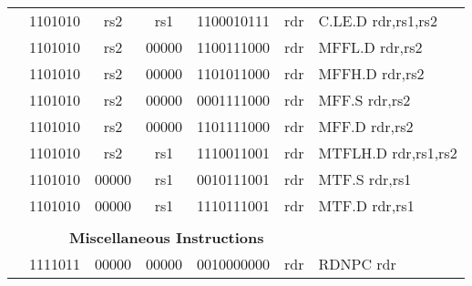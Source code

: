 \begin{table}[p]
\begin{small}
\begin{center}
\begin{tabular}{rcccccccccl}
&
\multicolumn{2}{|c|}{1101010} &
\multicolumn{1}{c|}{rs2} &
\multicolumn{1}{c|}{rs1} &
\multicolumn{4}{c|}{1100010111} &
\multicolumn{1}{c|}{rdr} & C.LE.D rdr,rs1,rs2 \\
\cline{2-10}
  

&
\multicolumn{2}{|c|}{1101010} &
\multicolumn{1}{c|}{rs2} &
\multicolumn{1}{c|}{00000} &
\multicolumn{4}{c|}{1100111000} &
\multicolumn{1}{c|}{rdr} & MFFL.D rdr,rs2 \\
\cline{2-10}
  

&
\multicolumn{2}{|c|}{1101010} &
\multicolumn{1}{c|}{rs2} &
\multicolumn{1}{c|}{00000} &
\multicolumn{4}{c|}{1101011000} &
\multicolumn{1}{c|}{rdr} & MFFH.D rdr,rs2 \\
\cline{2-10}
  

&
\multicolumn{2}{|c|}{1101010} &
\multicolumn{1}{c|}{rs2} &
\multicolumn{1}{c|}{00000} &
\multicolumn{4}{c|}{0001111000} &
\multicolumn{1}{c|}{rdr} & MFF.S rdr,rs2 \\
\cline{2-10}
  

&
\multicolumn{2}{|c|}{1101010} &
\multicolumn{1}{c|}{rs2} &
\multicolumn{1}{c|}{00000} &
\multicolumn{4}{c|}{1101111000} &
\multicolumn{1}{c|}{rdr} & MFF.D rdr,rs2 \\
\cline{2-10}
  

&
\multicolumn{2}{|c|}{1101010} &
\multicolumn{1}{c|}{rs2} &
\multicolumn{1}{c|}{rs1} &
\multicolumn{4}{c|}{1110011001} &
\multicolumn{1}{c|}{rdr} & MTFLH.D rdr,rs1,rs2 \\
\cline{2-10}
  

&
\multicolumn{2}{|c|}{1101010} &
\multicolumn{1}{c|}{00000} &
\multicolumn{1}{c|}{rs1} &
\multicolumn{4}{c|}{0010111001} &
\multicolumn{1}{c|}{rdr} & MTF.S rdr,rs1 \\
\cline{2-10}
  

&
\multicolumn{2}{|c|}{1101010} &
\multicolumn{1}{c|}{00000} &
\multicolumn{1}{c|}{rs1} &
\multicolumn{4}{c|}{1110111001} &
\multicolumn{1}{c|}{rdr} & MTF.D rdr,rs1 \\
\cline{2-10}
  

&
\multicolumn{9}{c}{} & \\
&
\multicolumn{9}{c}{\bf Miscellaneous Instructions} & \\
\cline{2-10}
  

&
\multicolumn{2}{|c|}{1111011} &
\multicolumn{1}{c|}{00000} &
\multicolumn{1}{c|}{00000} &
\multicolumn{4}{c|}{0010000000} &
\multicolumn{1}{c|}{rdr} & RDNPC rdr \\
\cline{2-10}
  


\end{tabular}
\end{center}
\end{small}
\end{table}
